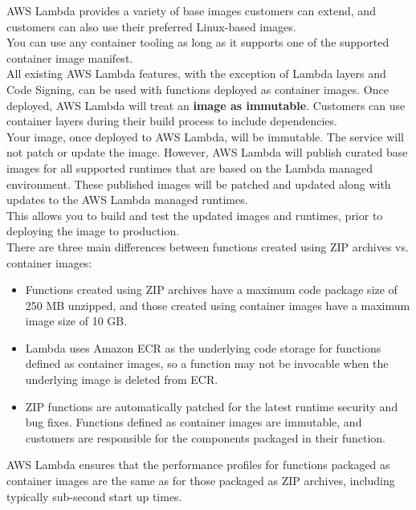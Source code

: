 \documentclass[12pt, letterpaper, twoside]{article}
\begin{document}
AWS Lambda provides a variety of base images customers can extend, and customers can also use their preferred Linux-based images.\\

You can use any container tooling as long as it supports one of the supported container image manifest.\\

All existing AWS Lambda features, with the exception of Lambda layers and Code Signing, can be used with functions deployed as container 
images. Once deployed, AWS Lambda will treat an \textbf{image as immutable}. Customers can use container layers during their build process 
to include dependencies.\\

Your image, once deployed to AWS Lambda, will be immutable. The service will not patch or update the image. However, AWS Lambda will publish 
curated base images for all supported runtimes that are based on the Lambda managed environment. These published images will be patched and 
updated along with updates to the AWS Lambda managed runtimes.\\
This allows you to build and test the updated images and runtimes, prior to deploying the image to production.\\

There are three main differences between functions created using ZIP archives vs. container images:
\begin{itemize}
	\item Functions created using ZIP archives have a maximum code package size of 250 MB unzipped, and those created using container images 
		have a maximum image size of 10 GB.
	\item Lambda uses Amazon ECR as the underlying code storage for functions defined as container images, so a function may not be invocable 
		when the underlying image is deleted from ECR.
	\item ZIP functions are automatically patched for the latest runtime security and bug fixes. Functions defined as container images are 
		immutable, and customers are responsible for the components packaged in their function.
\end{itemize}

AWS Lambda ensures that the performance profiles for functions packaged as container images are the same as for those packaged as ZIP archives, 
including typically sub-second start up times.\\
\end{document}
